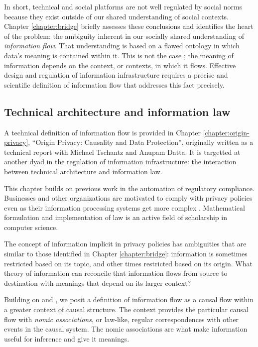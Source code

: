 \documentclass[../thesis.tex]{subfiles}
\begin{document}
 In short, technical and social platforms are not well
 regulated by social norms because they exist outside
 of our shared understanding of social contexts.
 Chapter \ref{chapter:bridge} briefly assesses these conclusions
 and identifies the  heart of the problem:
 the ambiguity inherent in our socially shared
 understanding of \textit{information flow}.
 That understanding is based on a flawed ontology
 in which data's meaning is contained within it.
 This is not the case \cite{horvitz2015data};
 the meaning of information depends on the context,
 or contexts, in which it flows.
 Effective design and regulation of information
 infrastructure requires a precise and scientific
 definition of information flow that addresses this
 fact precisely.
 
 \subsection{Technical architecture and information law}

 A technical definition of information flow is provided in
 Chapter \ref{chapter:origin-privacy}, ``Origin Privacy: Causality and Data Protection'', originally written as a technical report
 with Michael Tschantz and Anupam Datta. 
 It is targetted at another dyad in the regulation of information
 infrastructure: the interaction between technical architecture
 and information law.

 This chapter builds on previous work in the automation of
 regulatory compliance.
 Businesses and other organizations are motivated to comply
 with privacy policies even as their information
 processing systems get more complex \cite{barth2007privacy}
 \cite{deyoung2010experiences} \cite{sen2014bootstrapping}.
 Mathematical formulation and implementation of law is
 an active field of scholarship in computer science.

 The concept of information implicit in privacy policies
 has ambiguities that are similar to those identified
 in Chapter \ref{chapter:bridge}: information is sometimes
 restricted based on its topic, and other times restricted
 based on its origin.
 What theory of information can reconcile that information
 flows from source to destination with meanings that depend
 on its larger context?

 Building on \citet{dretske1981knowledge}
 and \citet{pearl2009causality}, we posit a definition
 of information flow as a causal flow within a greater
 context of causal structure.
 The context provides the particular causal flow with
 \textit{nomic associations}, or law-like, regular
 correspondences with other events in the causal system.
 The nomic associations are what make information useful
 for inference and give it meanings.
\end{document}
